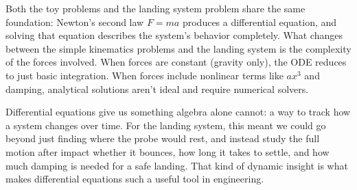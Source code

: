 \documentclass[12pt]{article}
\begin{document}
Both the toy problems and the landing system problem share the same foundation: Newton's
second law $F = ma$ produces a differential equation, and solving that equation describes
the system's behavior completely. What changes between the simple kinematics problems and
the landing system is the complexity of the forces involved. When forces are constant (gravity
only), the ODE reduces to just basic integration. When forces include nonlinear terms like $ax^3$
and damping, analytical solutions aren't ideal and require numerical solvers.

Differential equations give us something algebra alone cannot: a way to track how a system
changes over time. For the landing system, this meant we could go beyond just finding where
the probe would rest, and instead study the full motion after impact whether it bounces,
how long it takes to settle, and how much damping is needed for a safe landing. That kind of
dynamic insight is what makes differential equations such a useful tool in engineering.
\end{document}
